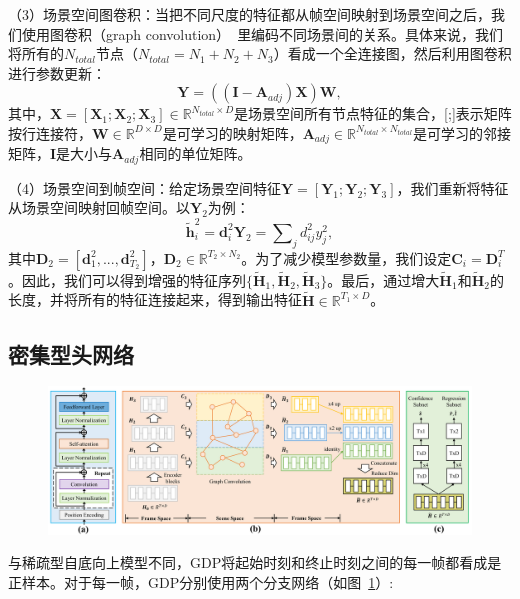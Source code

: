（3）场景空间图卷积：当把不同尺度的特征都从帧空间映射到场景空间之后，我们使用图卷积（graph convolution）~\cite{kipf2017semi}里编码不同场景间的关系。具体来说，我们将所有的$N_{total}$节点（$N_{total} = N_1 + N_2 + N_3$）看成一个全连接图，然后利用图卷积进行参数更新：
\begin{equation}
    \bm{Y} = ((\bm{I}-\bm{A}_{adj})\bm{X})\bm{W},
\end{equation}
其中，$\bm{X} = [\bm{X}_1; \bm{X}_2; \bm{X}_3] \in \mathbb{R}^{N_{total}\times D}$是场景空间所有节点特征的集合，[;]表示矩阵按行连接符，$\bm{W}\in \mathbb{R}^{D\times D}$是可学习的映射矩阵，$\bm{A}_{adj} \in \mathbb{R}^{N_{total}\times N_{total}}$是可学习的邻接矩阵，$\bm{I}$是大小与$\bm{A}_{adj}$相同的单位矩阵。

（4）场景空间到帧空间：给定场景空间特征$\bm{Y} = [\bm{Y}_1; \bm{Y}_2; \bm{Y}_3]$，我们重新将特征从场景空间映射回帧空间。以$\bm{Y}_2$为例：
\begin{equation}
    \tilde{\bm{h}}^2_i = \bm{d}^2_i \bm{Y}_2 = \sum\nolimits_j d^2_{ij} y^2_j,
\end{equation}
其中$\bm{D}_2 = [\bm{d}^2_1, ..., \bm{d}^2_{T_2}]$，$\bm{D}_2 \in \mathbb{R}^{T_2 \times N_2}$。为了减少模型参数量，我们设定$\bm{C}_i=\bm{D}^T_i$。因此，我们可以得到增强的特征序列$\{\tilde{\bm{H}}_1, \tilde{\bm{H}}_2, \tilde{\bm{H}}_3\}$。最后，通过增大$\tilde{\bm{H}}_1$和$\tilde{\bm{H}}_2$的长度，并将所有的特征连接起来，得到输出特征$\tilde{\bm{H}} \in \mathbb{R}^{T_1 \times D}$。


\subsection{密集型头网络}

\begin{figure}
    \centering
        \includegraphics[width=0.9\linewidth]{chapter6/res/head_network.pdf}
    \label{ch3:fig:head_network}
\end{figure}

与稀疏型自底向上模型不同，GDP将起始时刻和终止时刻之间的每一帧都看成是正样本。对于每一帧，GDP分别使用两个分支网络（如图~\ref{ch3:fig:head_network}）:


